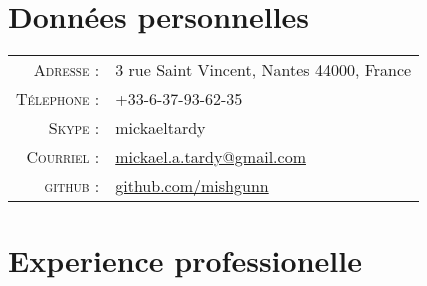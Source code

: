 \documentclass[letter,10pt]{article} %
\begin{document}
\pagestyle{empty} %



\par{\par} %
\par{\bigskip\par} %

\section{Donn\'{e}es personnelles}

\begin{tabular}{rl}
\textsc{Adresse :} & 3 rue Saint Vincent, Nantes  44000, France \\
\textsc{T\'{e}lephone :} & +33-6-37-93-62-35\\
\textsc{Skype :} & mickaeltardy\\
\textsc{Courriel :} & \href{mailto:mickael.a.tardy@gmail.com}{mickael.a.tardy@gmail.com} \\
\textsc{github :} & \href{https://github.com/mishgunn}{github.com/mishgunn} 
\end{tabular}


\section{Experience professionelle}
\end{document}
